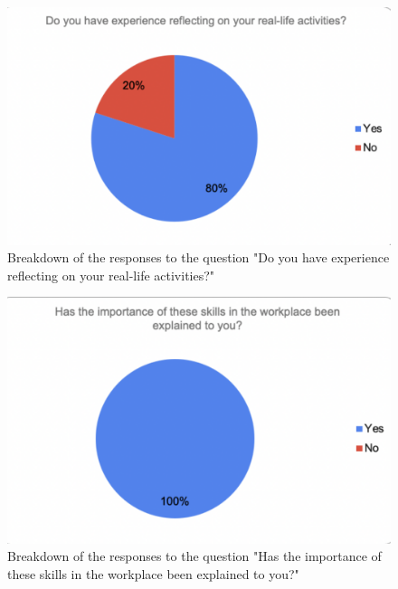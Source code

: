 \documentclass{l4proj}
\begin{document}
\begin{appendices}
\begin{figure}[H]
    \begin{centering}
    \includegraphics[scale=0.5]{images/GradAttr-4.pdf}
    \caption{Breakdown of the responses to the question "Do you have experience reflecting on your real-life activities?"}
    \label{fig: GradAttr-4}
    \end{centering}
\end{figure}

\begin{figure}[H]
    \begin{centering}
    \includegraphics[scale=0.5]{images/GradAttr-5.pdf}
    \caption{Breakdown of the responses to the question "Has the importance of these skills in the workplace been explained to you?"}
    \label{fig: GradAttr-5}
    \end{centering}
\end{figure}


\end{appendices}
\end{document}
